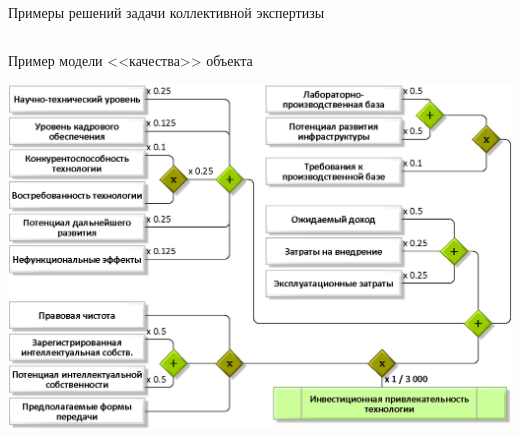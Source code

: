 \begin{frame}{Примеры решений задачи  коллективной экспертизы}
\begin{columns}
\begin{center}
	  \end{center}
  \end{columns}
\end{frame} %

\begin{frame}{Пример модели <<качества>> объекта}
	\begin{center}
		\includegraphics[width=0.85\linewidth]{./pic/schemeF2}
	\end{center}
\end{frame} %

